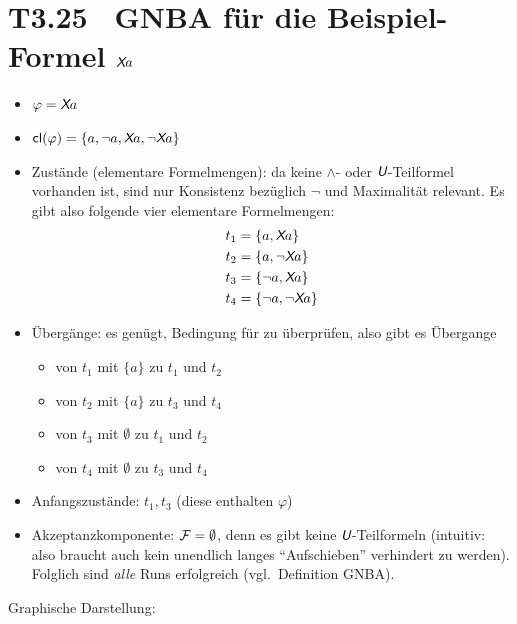 \documentclass[fontsize=11pt, twoside=false, numbers=autoenddot]{scrbook}
\begin{document}
\section*{{\boldmath T3.25~ GNBA für die Beispiel-Formel $\textit{\textsf{X}} a$}}

\begin{itemize}
  \item
    $\varphi = \textit{\textsf{X}} a$
  \item
    $\textsf{cl}(\varphi) = \{a, \lnot a, \textit{\textsf{X}} a, \lnot \textit{\textsf{X}} a\}$
  \item
    Zustände (elementare Formelmengen): da keine $\land$- oder $\mathbin{\textit{\textsf{U}}}$-Teilformel vorhanden ist,
    sind nur Konsistenz bezüglich $\lnot$ und Maximalität relevant.
    Es gibt also folgende vier elementare Formelmengen:
    \begin{align*}
      t_1 & = \{a,\textit{\textsf{X}} a\} \\
      t_2 & = \{a,\lnot\textit{\textsf{X}} a\} \\
      t_3 & = \{\lnot a,\textit{\textsf{X}} a\} \\
      t_4 & = \{\lnot a,\lnot\textit{\textsf{X}} a\}
    \end{align*}
  \item
    Übergänge: es genügt, Bedingung  für \X zu überprüfen,
    also gibt es Übergange
    \begin{itemize}
      \item
        von $t_1$ mit $\{a\}$ zu $t_1$ und $t_2$
      \item
        von $t_2$ mit $\{a\}$ zu $t_3$ und $t_4$
      \item
        von $t_3$ mit $\emptyset$ zu $t_1$ und $t_2$
      \item
        von $t_4$ mit $\emptyset$ zu $t_3$ und $t_4$
    \end{itemize}
  \item
    Anfangszustände: $t_1,t_3$ (diese enthalten $\varphi$)
  \item
    Akzeptanzkomponente: $\mathcal{F} = \emptyset$,
    denn es gibt keine $\mathbin{\textit{\textsf{U}}}$-Teilformeln
    (intuitiv: also braucht auch kein unendlich langes "`Aufschieben"'
    verhindert zu werden). Folglich sind \emph{alle} Runs erfolgreich
    (vgl.\ Definition GNBA).
\end{itemize}
%
Graphische Darstellung:
%
\end{document}

